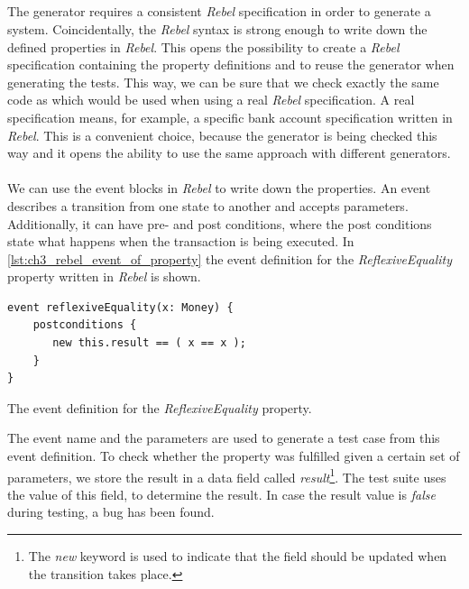 \subsection{\tfPhaseOne{}}
\label{sct:3_prop_to_rebel}
The generator requires a consistent \textit{Rebel} specification in order to
generate a system. Coincidentally, the \textit{Rebel} syntax is strong enough to
write down the defined properties in \textit{Rebel}. This opens the possibility
to create a \textit{Rebel} specification containing the property definitions and
to reuse the generator when generating the tests. This way, we can be sure that
we check exactly the same code as which would be used when using a real
\textit{Rebel} specification. A real specification means, for example, a
specific bank account specification written in \textit{Rebel}. This is a
convenient choice, because the generator is being checked this way and it opens
the  ability to use the same approach with different generators.\\
\\
We can use the event blocks in \textit{Rebel} to write down the properties. An
event describes a transition from one state to another and accepts parameters.
Additionally, it can have pre- and post conditions, where the post conditions
state what happens when the transaction is being executed. In
\autoref{lst:ch3_rebel_event_of_property} the event definition for the
\textit{ReflexiveEquality} property written in \textit{Rebel} is shown.
\begin{sourcecode}[!ht]
\begin{lstlisting}[language=Rebel]
event reflexiveEquality(x: Money) {
    postconditions {
       new this.result == ( x == x );
    }
}
\end{lstlisting}
\caption{The event definition for the \textit{ReflexiveEquality} property.}
\label{lst:ch3_rebel_event_of_property}
\end{sourcecode}
\FloatBarrier\noindent
The event name and the parameters are used to generate a test case from this
event definition. To check whether the property was fulfilled given a certain
set of parameters, we store the result in a data field called
\textit{result}\footnote{The \textit{new} keyword is used to indicate that the field
should be updated when the transition takes place.}. The test suite uses the value of
this field, to determine the result. In case the result value is \textit{false}
during testing, a bug has been found.\\
